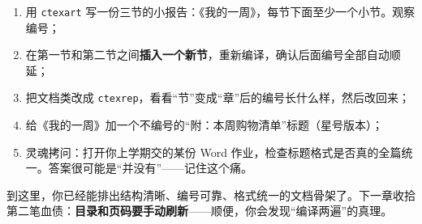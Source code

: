 \begin{enumerate}
\setlength{\itemsep}{2pt}
\item 用 \texttt{ctexart} 写一份三节的小报告：《我的一周》，每节下面至少一个小节。观察编号；
\item 在第一节和第二节之间\textbf{插入一个新节}，重新编译，确认后面编号全部自动顺延；
\item 把文档类改成 \texttt{ctexrep}，看看“节”变成“章”后的编号长什么样，然后改回来；
\item 给《我的一周》加一个不编号的“附：本周购物清单”标题（星号版本）；
\item 灵魂拷问：打开你上学期交的某份 Word 作业，检查标题格式是否真的全篇统一。答案很可能是“并没有”——记住这个痛。
\end{enumerate}

到这里，你已经能排出结构清晰、编号可靠、格式统一的文档骨架了。下一章收拾第二笔血债：\textbf{目录和页码要手动刷新}——顺便，你会发现“编译两遍”的真理。
